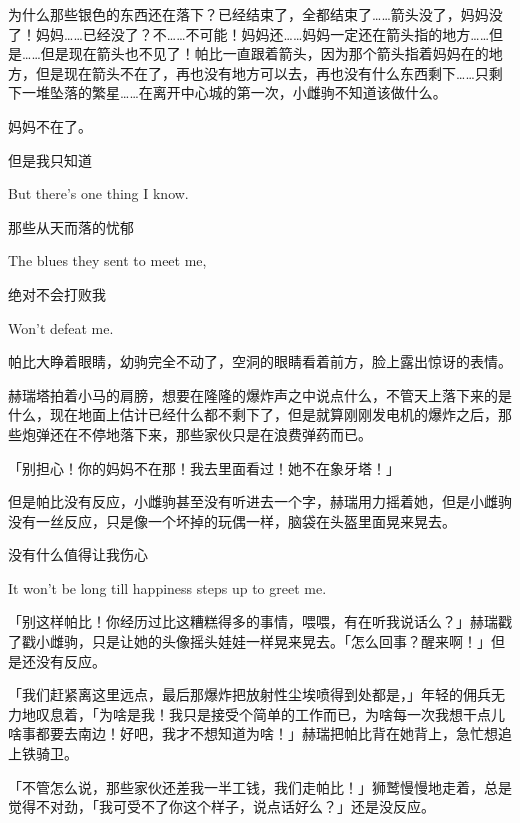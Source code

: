 为什么那些银色的东西还在落下？已经结束了，全都结束了……箭头没了，妈妈没了！妈妈……已经没了？不……不可能！妈妈还……妈妈一定还在箭头指的地方……但是……但是现在箭头也不见了！帕比一直跟着箭头，因为那个箭头指着妈妈在的地方，但是现在箭头不在了，再也没有地方可以去，再也没有什么东西剩下……只剩下一堆坠落的繁星……在离开中心城的第一次，小雌驹不知道该做什么。

妈妈不在了。


\begin{song}
    但是我只知道
    
    But there's one thing I know.
    
    \medskip

    那些从天而落的忧郁
    
    The blues they sent to meet me,
    
    \medskip

    绝对不会打败我
    
    Won't defeat me.
\end{song}

帕比大睁着眼睛，幼驹完全不动了，空洞的眼睛看着前方，脸上露出惊讶的表情。

赫瑞塔拍着小马的肩膀，想要在隆隆的爆炸声之中说点什么，不管天上落下来的是什么，现在地面上估计已经什么都不剩下了，但是就算刚刚发电机的爆炸之后，那些炮弹还在不停地落下来，那些家伙只是在浪费弹药而已。

「别担心！你的妈妈不在那！我去里面看过！她不在象牙塔！」

但是帕比没有反应，小雌驹甚至没有听进去一个字，赫瑞用力摇着她，但是小雌驹没有一丝反应，只是像一个坏掉的玩偶一样，脑袋在头盔里面晃来晃去。


\begin{song}
    没有什么值得让我伤心
    
    It won't be long till happiness steps up to greet me.
\end{song}

「别这样帕比！你经历过比这糟糕得多的事情，喂喂，有在听我说话么？」赫瑞戳了戳小雌驹，只是让她的头像摇头娃娃一样晃来晃去。「怎么回事？醒来啊！」但是还没有反应。

「我们赶紧离这里远点，最后那爆炸把放射性尘埃喷得到处都是，」年轻的佣兵无力地叹息着，「为啥是我！我只是接受个简单的工作而已，为啥每一次我想干点儿啥事都要去南边！好吧，我才不想知道为啥！」赫瑞把帕比背在她背上，急忙想追上铁骑卫。

「不管怎么说，那些家伙还差我一半工钱，我们走帕比！」狮鹫慢慢地走着，总是觉得不对劲，「我可受不了你这个样子，说点话好么？」还是没反应。

